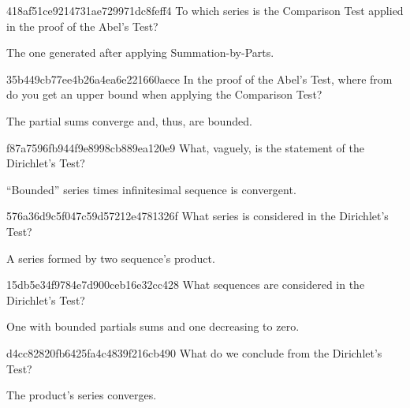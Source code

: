 \begin{note}{418af51ce9214731ae729971dc8feff4}
    To which series is the Comparison Test applied in the proof of the Abel's Test?

    \begin{cloze}{1}
        The one generated after applying Summation-by-Parts.
    \end{cloze}
\end{note}

\begin{note}{35b449cb77ee4b26a4ea6e221660aece}
    In the proof of the Abel's Test, where from do you get an upper bound when applying the Comparison Test?

    \begin{cloze}{1}
        The partial sums converge and, thus, are bounded.
    \end{cloze}
\end{note}

\begin{note}{f87a7596fb944f9e8998cb889ea120e9}
    What, vaguely, is the statement of the Dirichlet's Test?

    \begin{cloze}{1}
        ``Bounded'' series times infinitesimal sequence is convergent.
    \end{cloze}
\end{note}

\begin{note}{576a36d9c5f047c59d57212e4781326f}
    What series is considered in the Dirichlet's Test?

    \begin{cloze}{1}
        A series formed by two sequence's product.
    \end{cloze}
\end{note}

\begin{note}{15db5e34f9784e7d900ceb16e32cc428}
    What sequences are considered in the Dirichlet's Test?

    \begin{cloze}{1}
        One with bounded partials sums and one decreasing to zero.
    \end{cloze}
\end{note}

\begin{note}{d4cc82820fb6425fa4c4839f216cb490}
    What do we conclude from the Dirichlet's Test?

    \begin{cloze}{1}
        The product's series converges.
    \end{cloze}
\end{note}

